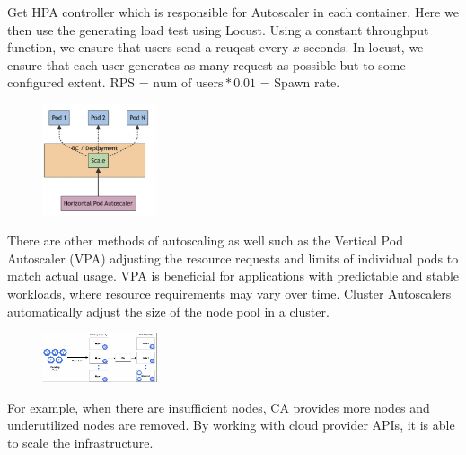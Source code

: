 \documentclass{article}
\begin{document}
Get HPA controller which is responsible for Autoscaler in each container. Here we then use the generating load test using Locust. Using a constant throughput function, we ensure that users send a reuqest every $x$ seconds. In locust, we ensure that each user generates as many request as possible but to some configured extent. RPS = $\text{num of users} * 0.01$ = Spawn rate.
\begin{figure}
    \begin{center}
        \includegraphics[width=0.3\textwidth]{../images/hpaStructure.png}
    \end{center}
  \end{figure} There are other methods of autoscaling as well such as the Vertical Pod Autoscaler (VPA) adjusting the resource requests and limits of individual pods to match actual usage. VPA is beneficial for applications with predictable and stable workloads, where resource requirements may vary over time. Cluster Autoscalers automatically adjust the size of the node pool in a cluster. \\\begin{figure}
    \begin{center}
        \includegraphics[width=0.3\textwidth]{../images/cpa.png}
    \end{center}
  \end{figure} For example, when there are insufficient nodes, CA provides more nodes and underutilized nodes are removed. By working with cloud provider APIs, it is able to scale the infrastructure. 
\end{document}
